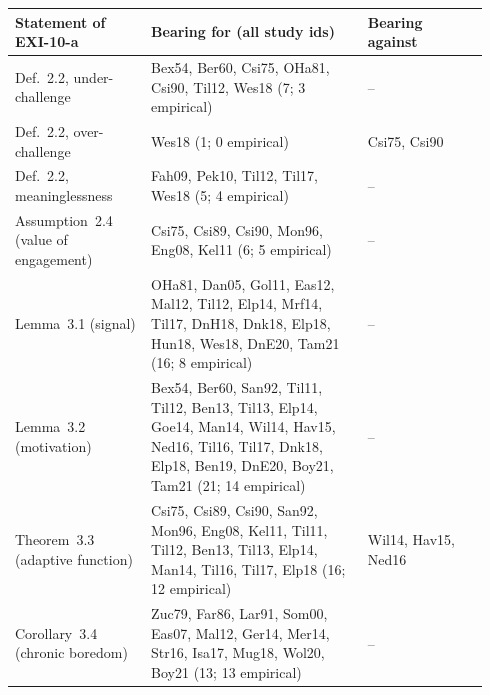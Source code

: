 {\small\setlength{\tabcolsep}{3pt}
\begin{longtable}{@{}p{0.27\linewidth}p{0.43\linewidth}p{0.24\linewidth}@{}}
\toprule
Statement of EXI-10-a & Bearing for (all study ids) & Bearing against \\
\midrule\endhead
\bottomrule\endfoot
Def.~2.2, under-challenge & Bex54, Ber60, Csi75, OHa81, Csi90, Til12, Wes18 (7; 3 empirical) & -- \\
Def.~2.2, over-challenge & Wes18 (1; 0 empirical) & Csi75, Csi90 \\
Def.~2.2, meaninglessness & Fah09, Pek10, Til12, Til17, Wes18 (5; 4 empirical) & -- \\
Assumption~2.4 (value of engagement) & Csi75, Csi89, Csi90, Mon96, Eng08, Kel11 (6; 5 empirical) & -- \\
Lemma~3.1 (signal) & OHa81, Dan05, Gol11, Eas12, Mal12, Til12, Elp14, Mrf14, Til17, DnH18, Dnk18, Elp18, Hun18, Wes18, DnE20, Tam21 (16; 8 empirical) & -- \\
Lemma~3.2 (motivation) & Bex54, Ber60, San92, Til11, Til12, Ben13, Til13, Elp14, Goe14, Man14, Wil14, Hav15, Ned16, Til16, Til17, Dnk18, Elp18, Ben19, DnE20, Boy21, Tam21 (21; 14 empirical) & -- \\
Theorem~3.3 (adaptive function) & Csi75, Csi89, Csi90, San92, Mon96, Eng08, Kel11, Til11, Til12, Ben13, Til13, Elp14, Man14, Til16, Til17, Elp18 (16; 12 empirical) & Wil14, Hav15, Ned16 \\
Corollary~3.4 (chronic boredom) & Zuc79, Far86, Lar91, Som00, Eas07, Mal12, Ger14, Mer14, Str16, Isa17, Mug18, Wol20, Boy21 (13; 13 empirical) & -- \\
\end{longtable}}

